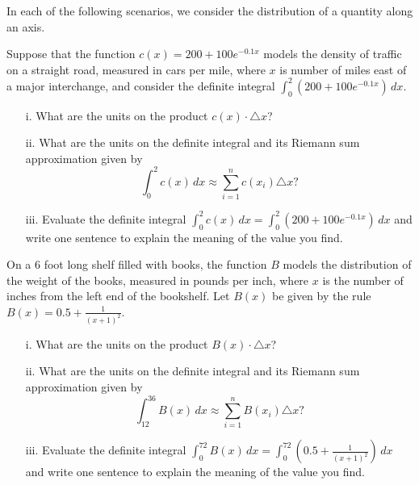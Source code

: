 \begin{pa} \label{PA:6.4}  In each of the following scenarios, we consider the distribution of a quantity along an axis.

\ba
\item Suppose that the function $c(x) = 200 + 100 e^{-0.1x}$ models the density of traffic on a straight road, measured in cars per mile, where $x$ is number of miles east of a major interchange, and consider the definite integral $\int_0^2 (200 + 100 e^{-0.1x}) \, dx$.
\begin{itemize}
\item[i.] What are the units on the product $c(x) \cdot \triangle x$?
\item[ii.] What are the units on the definite integral and its Riemann sum approximation given by
$$\int_0^2 c(x) \, dx \approx \sum_{i=1}^n c(x_i) \triangle x?$$
\item[iii.] Evaluate the definite integral $\int_0^2 c(x) \, dx = \int_0^2 (200 + 100 e^{-0.1x}) \, dx$ and write one sentence to explain the meaning of the value you find.
\end{itemize}
\item On a 6 foot long shelf filled with books, the function $B$ models the distribution of the weight of the books, measured in pounds per inch, where $x$ is the number of inches from the left end of the bookshelf.  Let $B(x)$ be given by the rule $B(x) = 0.5 + \frac{1}{(x+1)^2}$.
\begin{itemize}
\item[i.] What are the units on the product $B(x) \cdot \triangle x$?
\item[ii.] What are the units on the definite integral and its Riemann sum approximation given by
$$\int_{12}^{36} B(x) \, dx \approx \sum_{i=1}^n B(x_i) \triangle x?$$
\item[iii.] Evaluate the definite integral $\int_{0}^{72} B(x) \, dx = \int_0^{72} (0.5 + \frac{1}{(x+1)^2}) \, dx$ and write one sentence to explain the meaning of the value you find.
\end{itemize}
\ea
\end{pa} 
\afterpa